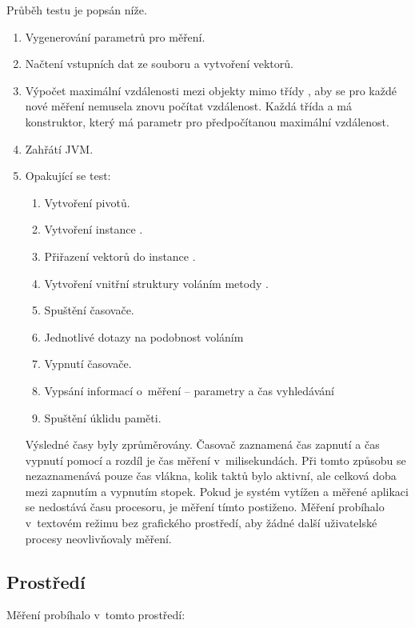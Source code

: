 Průběh testu je popsán níže.

\begin{enumerate}
\item Vygenerování parametrů pro měření.
\item Načtení vstupních dat ze souboru a vytvoření vektorů.
\item Výpočet maximální vzdálenosti mezi objekty mimo třídy , aby se pro každé nové měření nemusela znovu počítat vzdálenost.
Každá třída  a  má konstruktor, který má parametr pro předpočítanou maximální vzdálenost.
\item Zahřátí JVM.
\item Opakující se test:
\begin{enumerate}
\item Vytvoření pivotů.
\item Vytvoření instance \type{\MIndex{}}.
\item Přiřazení vektorů do instance \type{\MIndex{}}.
\item Vytvoření vnitřní struktury  voláním metody .
\item Spuštění časovače.
\item Jednotlivé dotazy na podobnost voláním 
\item Vypnutí časovače.
\item Vypsání informací o~měření -- parametry a čas vyhledávání
\item Spuštění úklidu paměti.
\end{enumerate}

Výsledné časy byly zprůměrovány.
Časovač zaznamená čas zapnutí a čas vypnutí pomocí  a rozdíl je čas měření v~milisekundách.
Při tomto způsobu se nezaznamenává pouze čas vlákna, kolik taktů bylo aktivní, ale celková doba mezi zapnutím a vypnutím stopek.
Pokud je systém vytížen a měřené aplikaci se nedostává času procesoru, je měření tímto postiženo.
Měření probíhalo v~textovém režimu bez grafického prostředí, aby žádné další uživatelské procesy neovlivňovaly měření.

\end{enumerate}
\subsection{Prostředí}
Měření probíhalo v~tomto prostředí:

